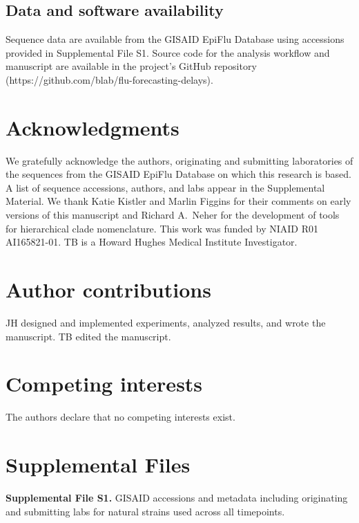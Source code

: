 \documentclass[9pt,lineno]{elife}
\begin{document}
\subsection*{Data and software availability}

Sequence data are available from the GISAID EpiFlu Database using accessions provided in Supplemental File S1.
Source code for the analysis workflow and manuscript are available in the project's GitHub repository (https://github.com/blab/flu-forecasting-delays).

\section*{Acknowledgments}

We gratefully acknowledge the authors, originating and submitting laboratories of the sequences from the GISAID EpiFlu Database \citep{gisaid} on which this research is based.
A list of sequence accessions, authors, and labs appear in the Supplemental Material.
We thank Katie Kistler and Marlin Figgins for their comments on early versions of this manuscript and Richard A.\ Neher for the development of tools for hierarchical clade nomenclature.
This work was funded by NIAID R01 AI165821-01.
TB is a Howard Hughes Medical Institute Investigator.

\section*{Author contributions}

JH designed and implemented experiments, analyzed results, and wrote the manuscript.
TB edited the manuscript.

\section*{Competing interests}

The authors declare that no competing interests exist.

\section*{Supplemental Files}

\textbf{Supplemental File S1.} GISAID accessions and metadata including originating and submitting labs for natural strains used across all timepoints.

\nocite{*} %

\end{document}
